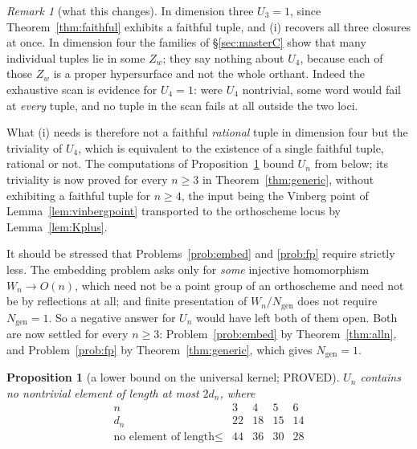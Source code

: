 \documentclass[11pt]{article}
\newtheorem{proposition}[theorem]{Proposition}
\theoremstyle{definition}
\theoremstyle{remark}
\newtheorem{remark}[theorem]{Remark}
\theoremstyle{definition}
\begin{document}
\begin{remark}[what this changes]\label{rem:unifychanges}
In dimension three $U_3=1$, since Theorem~\ref{thm:faithful} exhibits a faithful tuple, and
(i) recovers all three closures at once. In dimension four the families of
\S\ref{sec:masterC} show that many individual tuples lie in some $Z_w$; they say nothing about
$U_4$, because each of those $Z_w$ is a proper hypersurface and not the whole orthant. Indeed the
exhaustive scan is evidence for $U_4=1$: were $U_4$ nontrivial, some word would fail at
\emph{every} tuple, and no tuple in the scan fails at all outside the two loci.

What (i) needs is therefore not a faithful \emph{rational} tuple in dimension four but the
triviality of $U_4$, which is equivalent to the existence of a single faithful tuple, rational or
not. The computations of Proposition~\ref{prop:Ubound} bound $U_n$ from below; its triviality is
now proved for every $n\ge3$ in Theorem~\ref{thm:generic}, without exhibiting a faithful tuple for
$n\ge4$, the input being the Vinberg point of Lemma~\ref{lem:vinbergpoint} transported to the
orthoscheme locus by Lemma~\ref{lem:Kplus}.

It should be stressed that Problems~\textup{\ref{prob:embed}} and \textup{\ref{prob:fp}} require
strictly less. The embedding problem asks only for \emph{some} injective homomorphism
$W_n\to O(n)$, which need not be a point group of an orthoscheme and need not be by reflections
at all; and finite presentation of $W_n/N_{\mathrm{gen}}$ does not require
$N_{\mathrm{gen}}=1$. So a negative answer for $U_n$ would have left both of them open. Both are
now settled for every $n\ge3$: Problem~\ref{prob:embed} by Theorem~\ref{thm:alln}, and
Problem~\ref{prob:fp} by Theorem~\ref{thm:generic}, which gives $N_{\mathrm{gen}}=1$.
\end{remark}

\begin{proposition}[a lower bound on the universal kernel; PROVED]\label{prop:Ubound}
$U_n$ contains no nontrivial element of length at most $2d_n$, where
\[
\begin{array}{c|cccc}
 n & 3 & 4 & 5 & 6\\\hline
 d_n & 22 & 18 & 15 & 14\\
 \text{no element of length} \le & 44 & 36 & 30 & 28
\end{array}
\]
\end{proposition}
\end{document}
